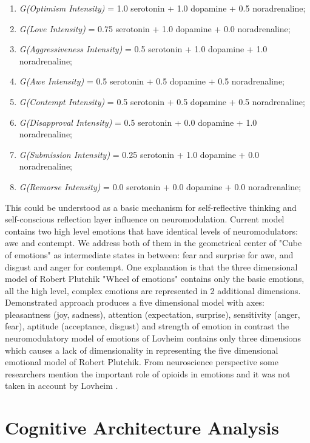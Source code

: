 \begin{enumerate}
 \item  \emph{G(Optimism Intensity)} = 1.0 serotonin  + 1.0 dopamine + 0.5 noradrenaline;
 \item  \emph{G(Love Intensity)} = 0.75 serotonin + 1.0 dopamine + 0.0 noradrenaline;
 \item  \emph{G(Aggressiveness Intensity)} = 0.5 serotonin + 1.0 dopamine + 1.0 noradrenaline;
 \item  \emph{G(Awe Intensity)} = 0.5 serotonin + 0.5 dopamine + 0.5 noradrenaline;
 \item  \emph{G(Contempt Intensity)} = 0.5 serotonin + 0.5 dopamine + 0.5 noradrenaline;
 \item  \emph{G(Disapproval Intensity)} = 0.5 serotonin + 0.0 dopamine + 1.0 noradrenaline;
 \item  \emph{G(Submission Intensity)} = 0.25 serotonin + 1.0 dopamine + 0.0 noradrenaline;
 \item  \emph{G(Remorse Intensity)} = 0.0 serotonin + 0.0 dopamine + 0.0 noradrenaline;
\end{enumerate}

This could be understood as a basic mechanism for self-reflective thinking and self-conscious reflection layer influence on neuromodulation. Current model contains two high level emotions that have identical levels of neuromodulators: awe and contempt. We address both of them in the geometrical center of "Cube of emotions" \cite{cubeofemotions} as intermediate states in between: fear and surprise for awe, and disgust and anger for contempt. One explanation is that the three dimensional model of Robert Plutchik "Wheel of emotions" contains only the basic emotions, all the high level, complex emotions are represented in 2 additional dimensions. Demonstrated approach produces a five dimensional model with axes: pleasantness (joy, sadness), attention (expectation, surprise), sensitivity (anger, fear), aptitude (acceptance, disgust) and strength of emotion \cite{senticcomputing} in contrast the neuromodulatory model of emotions of Lovheim contains only three dimensions which causes a lack of dimensionality in representing the five dimensional emotional model of Robert Plutchik. From neuroscience perspective some researchers mention the important role of opioids in emotions and it was not taken in account by Lovheim \cite{emotionsbraintorobot}.

\section{Cognitive Architecture Analysis}


